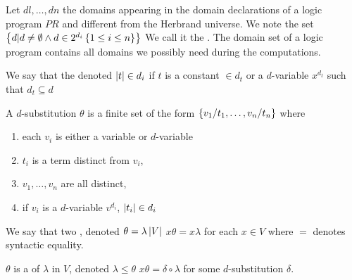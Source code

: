 \begin{defi}
Let $dl,\ldots ,dn$ the domains appearing in the domain declarations of a logic program $PR$ and different from the Herbrand universe. We note  the set $\left\{ d|d\neq\emptyset\wedge d\in 2^{d_i}\left\{ 1\leq i\leq n\right\}\right\}$ We call it the . The domain set of a logic program contains all domains we possibly need during the computations.
\cite{conf/ijcai/Hentenryck87}
\end{defi}

\begin{defi}
We say that the  denoted $\left|t\right|\in d_i$ if $t$ is a constant $\in d_t$ or a $d$-variable $x^{d_t}$ such that $d_t\subseteq d$
\cite{conf/ijcai/Hentenryck87}
\end{defi}

\begin{defi}[$d$-substitution]
A $d$-substitution $\theta$ is a finite set of the form $\left\{ v_1/t_1,\ldots,v_n/t_n\right\}$ where
\begin{enumerate}
 \item each $v_i$ is either a variable or $d$-variable
 \item $t_i$ is a term distinct from $v_i$,
 \item $v_1,\ldots,v_n$ are all distinct,
 \item if $v_i$ is a $d$-variable $v^{d_i}$, $\left|t_i\right|\in d_i$
\end{enumerate}
\cite{conf/ijcai/Hentenryck87}
\end{defi}

\begin{defi}
We say that two , denoted $\theta=\lambda\left|V\right|$ \iffTx{} $x\theta=x\lambda$ for each $x\in V$ where $=$ denotes syntactic equality.
\cite{conf/ijcai/Hentenryck87}
\end{defi}

\begin{defi}[$d$-instance]
$\theta$ is a  of $\lambda$ in $V$, denoted $\lambda\leq\theta$ \iffTx{} $x\theta=\delta\circ\lambda$ for some $d$-substitution $\delta$.
\cite{conf/ijcai/Hentenryck87}
\end{defi}

